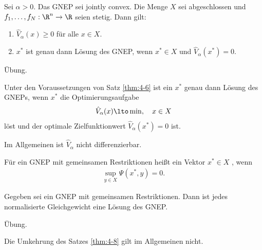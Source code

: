 \begin{satz}\label{thm:4-6}
  Sei $\alpha > 0$. Das GNEP sei jointly convex. Die Menge $X$ sei abgeschlossen und $f_{1}, \dots, f_{N}: \R^{n} \to \R$ seien stetig. Dann gilt:
  \begin{enumerate}
  \item  $\hat V_{\alpha} (x) \geq 0$ für alle $x \in X$. 
  \item $x^{*}$ ist genau dann Lösung des GNEP, wenn $x^{*} \in X$ und $\hat V _{\alpha} (x^{*}) = 0$. 
  \end{enumerate}
\end{satz}
\begin{beweis}
  Übung. 
\end{beweis}
\begin{korollar}\label{cor:4-7}
  Unter den Voraussetzungen von Satz \ref{thm:4-6} ist ein $x^{*}$ genau dann Lösung des GNEPs, wenn $x^{*}$ die Optimierungsaufgabe
  \begin{align}\label{eq:4-2}
    \hat V_{\alpha}(x) \lto \min, \quad x \in X 
  \end{align}
löst und der optimale Zielfunktionwert $\hat V_{\alpha} (x^{*}) = 0$ ist. 
\end{korollar}
Im Allgemeinen ist $\hat V_{\alpha}$ nicht differenzierbar. 
\begin{definition*}
  Für ein GNEP mit gemeinsamen Restriktionen heißt ein Vektor $x^{*} \in X$ , wenn
  \begin{align*}
    \sup_{y \in X} \Psi(x^{*}, y) = 0. 
  \end{align*}
\end{definition*}
\begin{satz}\label{thm:4-8}
  Gegeben sei ein GNEP mit gemeinsamen Restriktionen. Dann ist jedes normalisierte Gleichgewicht eine Lösung des GNEP. 
\end{satz}
\begin{beweis}
  Übung. 
\end{beweis}
\begin{bemerkung*}
  Die Umkehrung des Satzes \ref{thm:4-8} gilt im Allgemeinen nicht. 
\end{bemerkung*}

